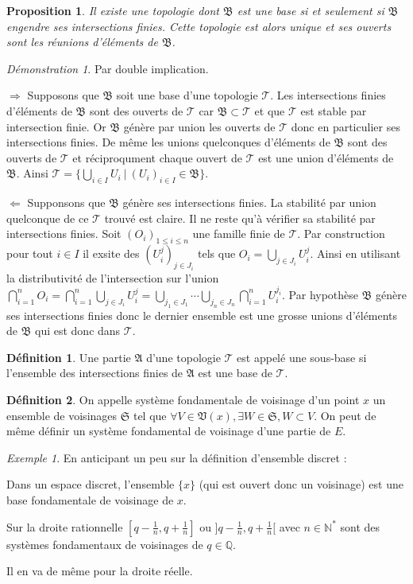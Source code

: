 \documentclass[a4paper, 11pt, french]{book}
\newenvironment{itemise}{\itemize}{\enditemize}
\theoremstyle{plain} %
\newtheorem{proposition}{Proposition}
\theoremstyle{definition} %
\newtheorem{definition}{Définition}
\theoremstyle{remark} %
\newtheorem{exemple}{Exemple}
\newtheorem*{demonstration}{Démonstration}
\newcommand{\1}{\mathds{1}}
\newcommand{\N}{\mathbb{N}}
\newcommand{\Q}{\mathbb{Q}}
\renewcommand{\frak}[1]{\mathfrak{#1}}
\newcommand{\scr}[1]{\mathscr{#1}}
\newcommand\ens[2]{\{#1 \ |\ #2\}}
\newcommand\equivalence[3]{
	\begin{demonstration}
		#1
		\begin{itemise}
			\item[$\Longrightarrow$] #2
			\item[$\Longleftarrow$] #3
		\end{itemise}
	\end{demonstration}
}
\begin{document}
\begin{proposition}
	Il existe une topologie dont $\frak{B}$ est une base si et seulement si $\frak{B}$ engendre ses intersections finies.
	Cette topologie est alors unique et ses ouverts sont les réunions d'éléments de $\frak{B}$.
\end{proposition}

\equivalence{Par double implication.}{
	Supposons que $\frak{B}$ soit une base d'une topologie $\scr{T}$.
	Les intersections finies d'éléments de $\frak{B}$ sont des ouverts de $\scr{T}$ car $\frak{B}\subset\scr{T}$ et que $\scr{T}$ est stable par intersection finie.
	Or $\frak{B}$ génère par union les ouverts de $\scr{T}$ donc en particulier ses intersections finies.
	De même les unions quelconques d'éléments de $\frak{B}$ sont des ouverts de $\scr{T}$ et réciproqument chaque ouvert de $\scr{T}$ est une union d'éléments de $\frak{B}$.
	Ainsi $\scr{T}=\ens{\bigcup_{i\in I}U_i}{(U_i)_{i\in I}\in\frak{B}}$.
}{
	Supponsons que $\frak{B}$ génère ses intersections finies.
	La stabilité par union quelconque de ce $\scr{T}$ trouvé est claire.
	Il ne reste qu'à vérifier sa stabilité par intersections finies.
	Soit $(O_i)_{1\leqslant i\leqslant n}$ une famille finie de $\scr{T}$.
	Par construction pour tout $i\in I$ il exsite des $(U_i^j)_{j\in J_i}$ tels que $O_i=\bigcup_{j\in J_i}U_i^j$.
	Ainsi en utilisant la distributivité de l'intersection sur l'union $\bigcap_{i=1}^nO_i
	=\bigcap_{i=1}^n\bigcup_{j\in J_i}U_i^j
	=\bigcup_{j_1\in J_1}\cdots\bigcup_{j_n\in J_n}\bigcap_{i=1}^nU_i^{j_i}$.
	Par hypothèse $\frak{B}$ génère ses intersections finies donc le dernier ensemble est une grosse unions d'éléments de $\frak{B}$ qui est donc dans $\scr{T}$.
}

\begin{definition}
	Une partie $\frak{A}$ d'une topologie $\scr{T}$ est appelé une sous-base si l’ensemble des intersections finies de $\frak{A}$ est une base de $\scr{T}$.
\end{definition}

\begin{definition}
	On appelle système fondamentale de voisinage d'un point $x$ un ensemble de voisinages $\frak{S}$ tel que $\forall V\in\frak{V}(x), \exists W\in\frak{S}, W\subset V$. On peut de même définir un système fondamental de voisinage d'une partie de $E$.
\end{definition}

\begin{exemple}
	En anticipant un peu sur la définition d'ensemble discret :
	\begin{itemise}
		\item Dans un espace discret, l'ensemble $\{x\}$ (qui est ouvert donc un voisinage) est une base fondamentale de voisinage de $x$.
		\item Sur la droite rationnelle $[q-\frac{1}{n}, q+\frac{1}{n}]$ ou $]q-\frac{1}{n}, q+\frac{1}{n}[$ avec $n\in\N^*$ sont des systèmes fondamentaux de voisinages de $q\in\Q$.
		\item Il en va de même pour la droite réelle.
	\end{itemise}
\end{exemple}
\end{document}
